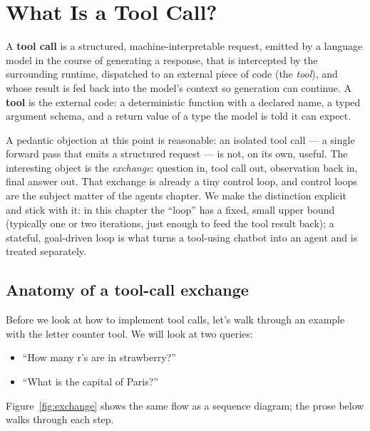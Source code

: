 \section{What Is a Tool Call?}
\label{sec:def}

\begin{definitionbox}
A \textbf{tool call} is a structured, machine-interpretable request,
emitted by a language model in the course of generating a response,
that is intercepted by the surrounding runtime, dispatched to an
external piece of code (the \emph{tool}), and whose result is fed
back into the model's context so generation can continue. A
\textbf{tool} is the external code: a deterministic function with a
declared name, a typed argument schema, and a return value of a type
the model is told it can expect.
\end{definitionbox}

\begin{remarkbox}
\small
A pedantic objection at this point is reasonable: an isolated tool
call --- a single forward pass that emits a structured request --- is
not, on its own, useful. The interesting object is the
\emph{exchange}: question in, tool call out, observation back in,
final answer out. That exchange is already a tiny control loop, and
control loops are the subject matter of the agents chapter. We make
the distinction explicit and stick with it: in this chapter the
``loop'' has a fixed, small upper bound (typically one or two
iterations, just enough to feed the tool result back); a stateful,
goal-driven loop is what turns a tool-using chatbot into an agent
and is treated separately.
\end{remarkbox}

\subsection{Anatomy of a tool-call exchange}
\label{sec:def-exchange}

Before we look at how to implement tool calls, let's walk through an
example with the letter counter tool. We will look at two queries:
\begin{itemize}
\item ``How many r's are in strawberry?''
\item ``What is the capital of Paris?''
\end{itemize}

Figure~\ref{fig:exchange} shows the same flow as a sequence diagram;
the prose below walks through each step.

